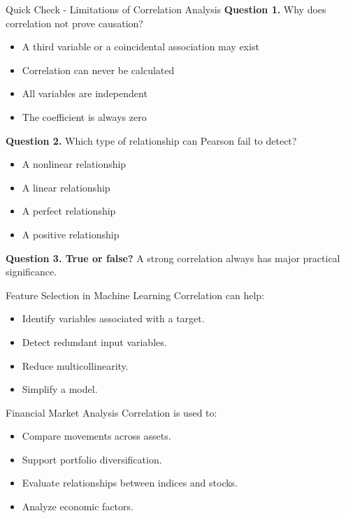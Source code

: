 \documentclass[aspectratio=169,11pt]{beamer}
\begin{document}
\begin{frame}[allowframebreaks]{Quick Check - Limitations of Correlation Analysis}
\footnotesize
\textbf{Question 1.} Why does correlation not prove causation?\par\medskip
\begin{itemize}
\item[\textbf{A.}] A third variable or a coincidental association may exist
\item[\textbf{B.}] Correlation can never be calculated
\item[\textbf{C.}] All variables are independent
\item[\textbf{D.}] The coefficient is always zero
\end{itemize}
\textbf{Question 2.} Which type of relationship can Pearson fail to detect?\par\medskip
\begin{itemize}
\item[\textbf{A.}] A nonlinear relationship
\item[\textbf{B.}] A linear relationship
\item[\textbf{C.}] A perfect relationship
\item[\textbf{D.}] A positive relationship
\end{itemize}
\textbf{Question 3. True or false?} A strong correlation always has major practical significance.\par\medskip
\end{frame}
\begin{frame}[allowframebreaks]{Feature Selection in Machine Learning}
\small
Correlation can help:\par\medskip
\begin{itemize}
\item Identify variables associated with a target.
\item Detect redundant input variables.
\item Reduce multicollinearity.
\item Simplify a model.
\end{itemize}
\end{frame}
\begin{frame}[allowframebreaks]{Financial Market Analysis}
\small
Correlation is used to:\par\medskip
\begin{itemize}
\item Compare movements across assets.
\item Support portfolio diversification.
\item Evaluate relationships between indices and stocks.
\item Analyze economic factors.
\end{itemize}
\end{frame}
\end{document}
